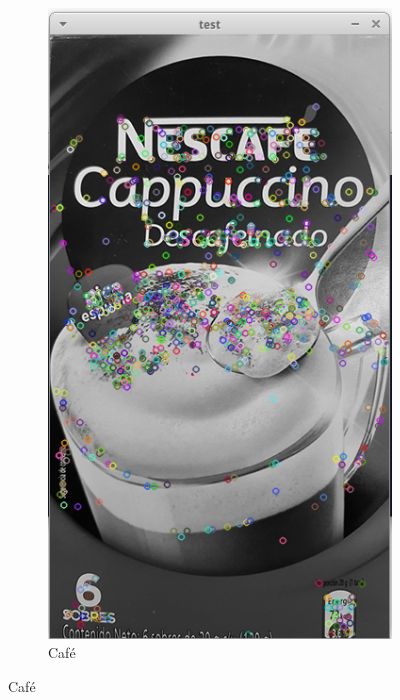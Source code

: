 \begin{figure}[H]
\begin{subfigure}[b]{0.2\textwidth}
        \includegraphics[width=\textwidth]{img/cafe.png}
        \caption{Café}
    \end{subfigure}


\end{figure}
